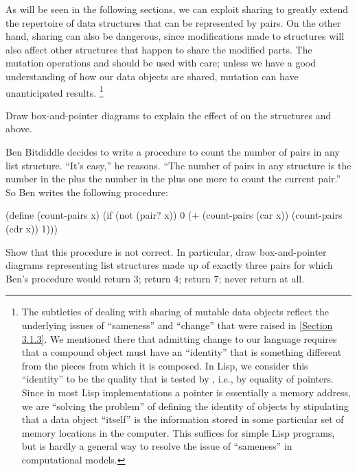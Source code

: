 As will be seen in the following sections, we can exploit sharing to greatly extend the repertoire of data structures that can be represented by pairs.
On the other hand, sharing can also be dangerous, since modifications made to structures will also affect other structures that happen to share the modified parts.
The mutation operations  and  should be used with care;
unless we have a good understanding of how our data objects are shared, mutation can have unanticipated results.%
\footnote{
	The subtleties of dealing with sharing of mutable data objects reflect the underlying issues of “sameness”  and  “change” that were raised in \cref{Section 3.1.3}.
	We mentioned there that admitting change to our language requires that a compound object must have an “identity” that is something different from the pieces from which it is composed.
	In Lisp, we consider this “identity” to be the quality that is tested by , i.e., by equality of pointers.
	Since in most Lisp implementations a pointer is essentially a memory address, we are “solving the problem” of defining the identity of objects by stipulating that a data object “itself” is the information stored in some particular set of memory locations in the computer.
	This suffices for simple Lisp programs, but is hardly a general way to resolve the issue of “sameness” in computational models.
}



\begin{exercise}
	\label{Exercise 3.15}
	Draw box-and-pointer diagrams to explain the effect of  on the structures  and  above.
\end{exercise}



\begin{exercise}
	\label{Exercise 3.16}
	Ben Bitdiddle decides to write a procedure to count the number of pairs in any list structure.
	“It’s easy,” he reasons.
	“The number of pairs in any structure is the number in the  plus the number in the  plus one more to count the current pair.”
	So Ben writes the following procedure:
	\begin{scheme}
	  (define (count-pairs x)
	    (if (not (pair? x))
	        0
	        (+ (count-pairs (car x))
	           (count-pairs (cdr x))
	           1)))
	\end{scheme}
	Show that this procedure is not correct.
	In particular, draw box-and-pointer diagrams representing list structures made up of exactly three pairs for which Ben’s procedure would return 3;
	return 4;
	return 7;
	never return at all.
\end{exercise}



